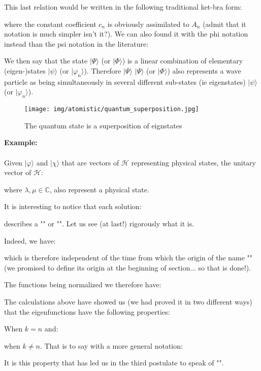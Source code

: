 	This last relation would be written in the following traditional ket-bra form:
	
	where the constant coefficient $c_n$ is obviously assimilated to $A_n$ (admit that it notation is much simpler isn't it?). We can also found it with the phi notation instead than the psi notation in the literature:
	
	We then say that the state $|\Psi\rangle$ (or $\mid\Phi\rangle$) is a linear combination of elementary (eigen-)states $|\psi\rangle$ (or $\mid\varphi_n\rangle$). Therefore $|\Psi\rangle$ $|\Psi\rangle$ (or $\mid\Phi\rangle$) also represents a wave particle as being simultaneously in several different sub-states (ie eigenstates) $|\psi\rangle$ (or $\mid\varphi_n\rangle$).
	\begin{figure}[H]
		\centering
		\texttt{[image: img/atomistic/quantum\_superposition.jpg]}	
		\caption{The quantum state is a superposition of eignstates}
	\end{figure}
	\begin{tcolorbox}[colframe=black,colback=white,sharp corners]
	\textbf{{\Large {}}Example:}\\\\
	Given $|\varphi\rangle$ and $|\chi\rangle$ that are vectors of $\mathcal{H}$ representing physical states, the unitary vector of $\mathcal{H}$:
	
	where $\lambda,\mu\in\mathbb{C}$, also represent a physical state.
	\end{tcolorbox}
	It is interesting to notice that each solution:
	
	describes a "" or "". Let us see (at last!) rigorously what it is.

	Indeed, we have:
	
	which is therefore independent of the time from which the origin of the name "" (we promised to define its origin at the beginning of section... so that is done!).

	The functions being normalized we therefore have:
	
	The calculations above have showed us (we had proved it in two different ways) that the eigenfunctions have the following properties:
	
	When $k=n$ and:
	
	when $k\neq n$. That is to say with a more general notation:
	
	It is this property that has led us in the third postulate to speak of "".
	
